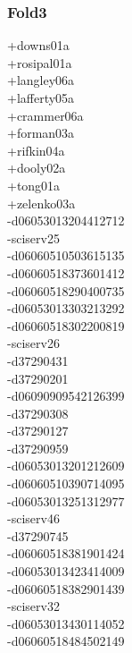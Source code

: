 \begin{multicols}{3}
\subsubsection*{Fold3}
+downs01a\\
+rosipal01a\\
+langley06a\\
+lafferty05a\\
+crammer06a\\
+forman03a\\
+rifkin04a\\
+dooly02a\\
+tong01a\\
+zelenko03a\\
-d06053013204412712\\
-sciserv25\\
-d06060510503615135\\
-d06060518373601412\\
-d06060518290400735\\
-d06053013303213292\\
-d06060518302200819\\
-sciserv26\\
-d37290431\\
-d37290201\\
-d06090909542126399\\
-d37290308\\
-d37290127\\
-d37290959\\
-d06053013201212609\\
-d06060510390714095\\
-d06053013251312977\\
-sciserv46\\
-d37290745\\
-d06060518381901424\\
-d06053013423414009\\
-d06060518382901439\\
-sciserv32\\
-d06053013430114052\\
-d06060518484502149\\

\end{multicols}
